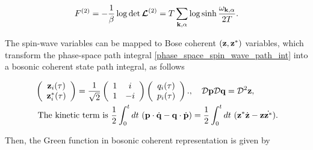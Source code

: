 \documentclass{homework}
\begin{document}
\begin{equation}
    F^{(2)} = -\frac{1}{\beta} \log \det \bm{\mathcal{L}}^{(2)} = T \sum_{{\bf k}, \alpha} \log \sinh \frac{\omega_{{\bf k}, \alpha}}{2T}. 
\end{equation}

The spin-wave variables can be mapped to Bose coherent $({\bf z}, {\bf z}^{*})$ variables, which transform the phase-space path integral \cref{phase_space_spin_wave_path_int} into a bosonic coherent state path integral, as follows 

\begin{equation}
\begin{split}
    &\left(\begin{array}{c}
         {\bf z}_{i}(\tau)  \\
         {\bf z}^{*}_{i}(\tau) 
    \end{array}\right) = \frac{1}{\sqrt{2}} \left(\begin{array}{cc}
         1 & i \\
         1 & -i 
    \end{array}\right)
    \left(\begin{array}{c}
         q_{i}(\tau)  \\
         p_{i}(\tau) 
    \end{array}\right)., \quad \mathcal{D}{\bf p}\mathcal{D}{\bf q} = \mathcal{D}^2{\bf z}, \\
    &\textnormal{ The kinetic term is } \frac{1}{2} \int_{0}^{t} dt \textnormal{ } ({\bf p} \cdot \dot{{\bf q}} - {\bf q} \cdot \dot{{\bf p}}) = \frac{1}{2} \int_{0}^{t} dt \textnormal{ } ({\bf z}^{*}\dot{{\bf z}} - {\bf z}\dot{{\bf z}^{*}}).
\end{split}
\end{equation}

Then, the Green function in bosonic coherent representation is given by 
\end{document}
